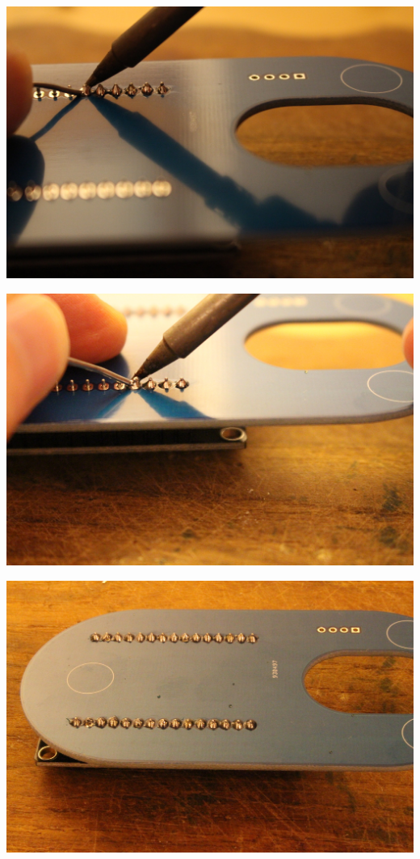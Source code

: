\documentclass{article}
\begin{document}
\begin{minipage}[b]{0.5\textwidth}
	\includegraphics[width=\textwidth]{Bilder2019/IMG_6468.JPG}
\end{minipage}
\begin{minipage}[b]{0.5\textwidth}
	\includegraphics[width=\textwidth]{Bilder2019/IMG_6469.JPG}
\end{minipage}

\vspace{0.5cm}

\begin{minipage}[b]{0.5\textwidth}
	\includegraphics[width=\textwidth]{Bilder2019/IMG_6472.JPG}
\end{minipage}
\end{document}
